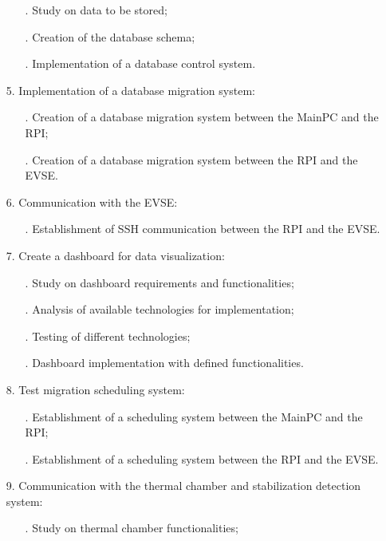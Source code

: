 \begin{itemize}
\begin{itemize}
            \item[.] Study on data to be stored;
            \item[.] Creation of the database schema;
            \item[.] Implementation of a database control system.
        \end{itemize}
    \item[] 5. Implementation of a database migration system:
        \begin{itemize}
            \item [.] Creation of a database migration system between the MainPC and the RPI;
            \item [.] Creation of a database migration system between the RPI and the EVSE.
        \end{itemize}
    \item[] 6. Communication with the EVSE:
        \begin{itemize}
            \item[.] Establishment of SSH communication between the RPI and the EVSE.
        \end{itemize}
    \item[] 7. Create a dashboard for data visualization:
        \begin{itemize}
            \item[.] Study on dashboard requirements and functionalities;
            \item[.] Analysis of available technologies for implementation;
            \item[.] Testing of different technologies;
            \item[.] Dashboard implementation with defined functionalities.
        \end{itemize}
    \item[] 8. Test migration scheduling system: 
        \begin{itemize}
            \item[.] Establishment of a scheduling system between the MainPC and the RPI;
            \item[.] Establishment of a scheduling system between the RPI and the EVSE.
        \end{itemize}
    \item[] 9.  Communication with the thermal chamber and stabilization detection system:
        \begin{itemize}
            \item[.] Study on thermal chamber functionalities;

\end{itemize}
\end{itemize}
